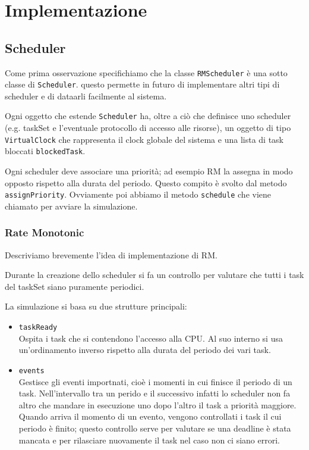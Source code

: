\chapter{Implementazione}

\section{Scheduler}
Come prima osservazione specifichiamo che la classe \texttt{RMScheduler} è una sotto classe di \texttt{Scheduler}. questo permette in futuro di implementare altri tipi di scheduler e di dataarli facilmente al sistema.

Ogni oggetto che estende \texttt{Scheduler} ha, oltre a ciò che definisce uno scheduler (e.g. taskSet e l'eventuale protocollo di accesso alle risorse), un oggetto di tipo \texttt{VirtualClock} che rappresenta il clock globale del sistema e una lista di task bloccati \texttt{blockedTask}.

Ogni scheduler deve associare una priorità; ad esempio RM la assegna in modo opposto rispetto alla durata del periodo. Questo compito è svolto dal metodo \texttt{assignPriority}. Ovviamente poi abbiamo il metodo \texttt{schedule} che viene chiamato per avviare la simulazione.

\subsection{Rate Monotonic}
Descriviamo brevemente l'idea di implementazione di RM.

Durante la creazione dello scheduler si fa un controllo per valutare che tutti i task del taskSet siano puramente periodici.

\myskip

La simulazione si basa su due strutture principali:
\begin{itemize}
    \item \texttt{taskReady} \\
        Ospita i task che si contendono l'accesso alla CPU. Al suo interno si usa un'ordinamento inverso rispetto alla durata del periodo dei vari task.
    \item \texttt{events} \\
    Gestisce gli eventi importnati, cioè i momenti in cui finisce il periodo di un task. Nell'intervallo tra un perido e il successivo infatti lo scheduler non fa altro che mandare in esecuzione uno dopo l'altro il task a priorità maggiore. Quando arriva il momento di un evento, vengono controllati i task il cui periodo è finito; questo controllo serve per valutare se una deadline è stata mancata e per rilasciare nuovamente il task nel caso non ci siano errori.
\end{itemize}

